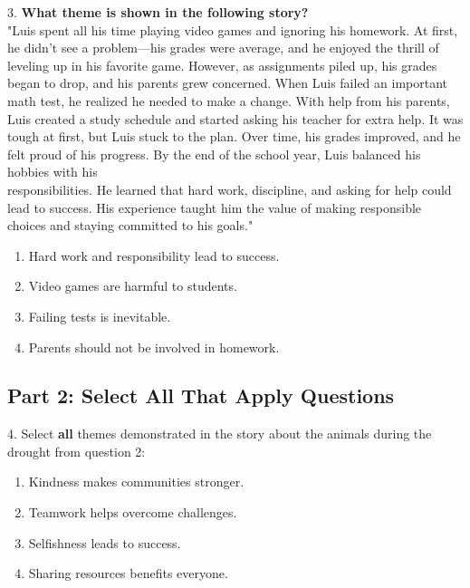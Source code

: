 \documentclass[12pt]{article}
\begin{document}
3. \textbf{What theme is shown in the following story?\\}
"Luis spent all his time playing video games and ignoring his homework. At first, he didn’t see a problem—his grades were average, and he enjoyed the thrill of leveling up in his favorite game. However, as assignments piled up, his grades began to drop, and his parents grew concerned. When Luis failed an important math test, he realized he needed to make a change. With help from his parents, Luis created a study schedule and started asking his teacher for extra help. It was tough at first, but Luis stuck to the plan. Over time, his grades improved, and he felt proud of his progress. By the end of the school year, Luis balanced his hobbies with his \\responsibilities. He learned that hard work, discipline, and asking for help could lead to success. His experience taught him the value of making responsible choices and staying committed to his goals."\\
\begin{enumerate}[label=\Alph*.]
    \item Hard work and responsibility lead to success.  
    \item Video games are harmful to students.  
    \item Failing tests is inevitable.  
    \item Parents should not be involved in homework.  
\end{enumerate}

\vspace{1cm}

\subsection*{Part 2: Select All That Apply Questions}

4. Select \textbf{all} themes demonstrated in the story about the animals during the drought from question 2:\\
\begin{enumerate}[label=\Alph*.]
    \item Kindness makes communities stronger.  
    \item Teamwork helps overcome challenges.  
    \item Selfishness leads to success.  
    \item Sharing resources benefits everyone.  
\end{enumerate}

\vspace{1cm}
\end{document}
